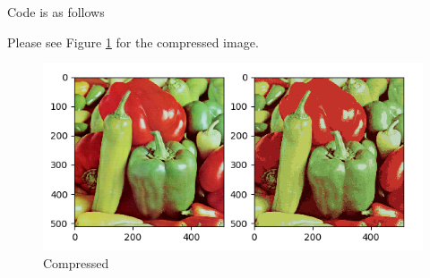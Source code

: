\begin{answer}

Code is as follows
    

    Please see Figure \ref{fig:compressed} for the compressed image.

    \begin{figure}[htbp]
        \centering
        \includegraphics[width=0.7\linewidth]{pics/compressed.png}
        \caption{Compressed}
        \label{fig:compressed}
    \end{figure}
\end{answer}
